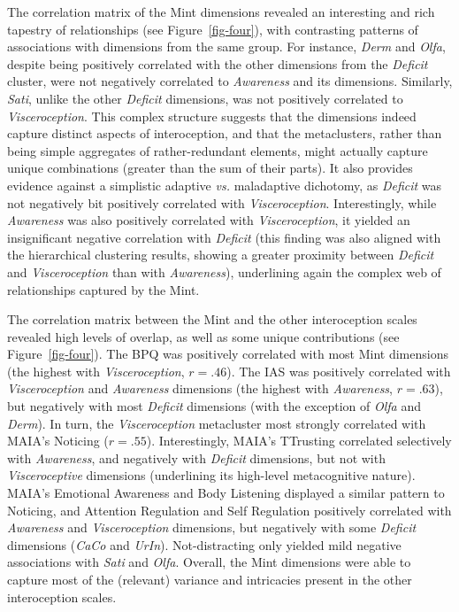 \documentclass[
  jou,
  floatsintext,
  longtable,
  nolmodern,
  notxfonts,
  notimes,
  colorlinks=true,linkcolor=blue,citecolor=blue,urlcolor=blue]{apa7}
\begin{document}
The correlation matrix of the Mint dimensions revealed an interesting
and rich tapestry of relationships (see Figure~\ref{fig-four}), with
contrasting patterns of associations with dimensions from the same
group. For instance, \emph{Derm} and \emph{Olfa}, despite being
positively correlated with the other dimensions from the \emph{Deficit}
cluster, were not negatively correlated to \emph{Awareness} and its
dimensions. Similarly, \emph{Sati}, unlike the other \emph{Deficit}
dimensions, was not positively correlated to \emph{Visceroception}. This
complex structure suggests that the dimensions indeed capture distinct
aspects of interoception, and that the metaclusters, rather than being
simple aggregates of rather-redundant elements, might actually capture
unique combinations (greater than the sum of their parts). It also
provides evidence against a simplistic adaptive \emph{vs.} maladaptive
dichotomy, as \emph{Deficit} was not negatively bit positively
correlated with \emph{Visceroception}. Interestingly, while
\emph{Awareness} was also positively correlated with
\emph{Visceroception}, it yielded an insignificant negative correlation
with \emph{Deficit} (this finding was also aligned with the hierarchical
clustering results, showing a greater proximity between \emph{Deficit}
and \emph{Visceroception} than with \emph{Awareness}), underlining again
the complex web of relationships captured by the Mint.

The correlation matrix between the Mint and the other interoception
scales revealed high levels of overlap, as well as some unique
contributions (see Figure~\ref{fig-four}). The BPQ was positively
correlated with most Mint dimensions (the highest with
\emph{Visceroception}, \(r = .46\)). The IAS was positively correlated
with \emph{Visceroception} and \emph{Awareness} dimensions (the highest
with \emph{Awareness}, \(r = .63\)), but negatively with most
\emph{Deficit} dimensions (with the exception of \emph{Olfa} and
\emph{Derm}). In turn, the \emph{Visceroception} metacluster most
strongly correlated with MAIA's Noticing (\(r = .55\)). Interestingly,
MAIA's TTrusting correlated selectively with \emph{Awareness}, and
negatively with \emph{Deficit} dimensions, but not with
\emph{Visceroceptive} dimensions (underlining its high-level
metacognitive nature). MAIA's Emotional Awareness and Body Listening
displayed a similar pattern to Noticing, and Attention Regulation and
Self Regulation positively correlated with \emph{Awareness} and
\emph{Visceroception} dimensions, but negatively with some
\emph{Deficit} dimensions (\emph{CaCo} and \emph{UrIn}). Not-distracting
only yielded mild negative associations with \emph{Sati} and
\emph{Olfa}. Overall, the Mint dimensions were able to capture most of
the (relevant) variance and intricacies present in the other
interoception scales.
\end{document}
